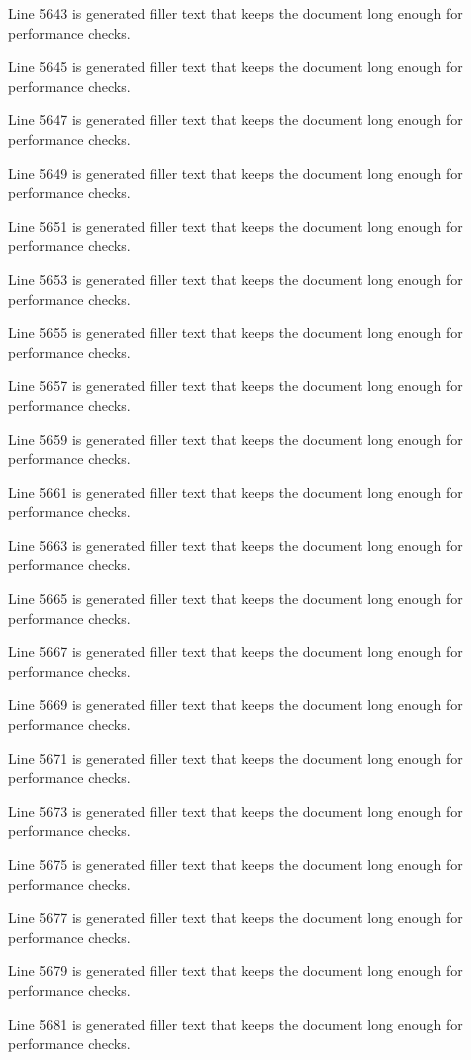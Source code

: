 Line 5643 is generated filler text that keeps the document long enough for performance checks.

Line 5645 is generated filler text that keeps the document long enough for performance checks.

Line 5647 is generated filler text that keeps the document long enough for performance checks.

Line 5649 is generated filler text that keeps the document long enough for performance checks.

Line 5651 is generated filler text that keeps the document long enough for performance checks.

Line 5653 is generated filler text that keeps the document long enough for performance checks.

Line 5655 is generated filler text that keeps the document long enough for performance checks.

Line 5657 is generated filler text that keeps the document long enough for performance checks.

Line 5659 is generated filler text that keeps the document long enough for performance checks.

Line 5661 is generated filler text that keeps the document long enough for performance checks.

Line 5663 is generated filler text that keeps the document long enough for performance checks.

Line 5665 is generated filler text that keeps the document long enough for performance checks.

Line 5667 is generated filler text that keeps the document long enough for performance checks.

Line 5669 is generated filler text that keeps the document long enough for performance checks.

Line 5671 is generated filler text that keeps the document long enough for performance checks.

Line 5673 is generated filler text that keeps the document long enough for performance checks.

Line 5675 is generated filler text that keeps the document long enough for performance checks.

Line 5677 is generated filler text that keeps the document long enough for performance checks.

Line 5679 is generated filler text that keeps the document long enough for performance checks.

Line 5681 is generated filler text that keeps the document long enough for performance checks.

